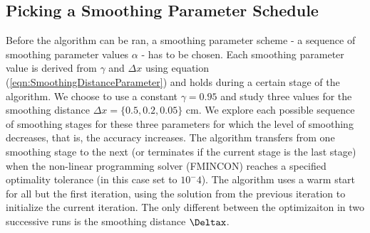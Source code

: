 \documentclass{iopart}
\begin{document}

\subsection{Picking a Smoothing Parameter Schedule}
Before the algorithm can be ran, a smoothing parameter scheme - a sequence of smoothing parameter values $\alpha$ - has to be chosen.
Each smoothing parameter value is derived from $\gamma$ and $\Delta x$ using equation (\ref{eqn:SmoothingDistanceParameter}) and holds during a certain stage of the algorithm. 
We choose to use a constant $\gamma = 0.95$ and study three values for the smoothing distance $\Delta x = \{0.5, 0.2, 0.05\}$ cm.
We explore each possible sequence of smoothing stages for these three parameters for which the level of smoothing decreases, that is, the accuracy increases.
The algorithm transfers from one smoothing stage to the next (or terminates if the current stage is the last stage) when the non-linear programming solver (FMINCON) reaches a specified optimality tolerance (in this case set to $10^-4$). The algorithm uses a warm start for all but the first iteration, using the solution from the previous iteration to initialize the current iteration. The only different between the optimizaiton in two successive runs is the smoothing distance $\Deltax$.

\end{document}
